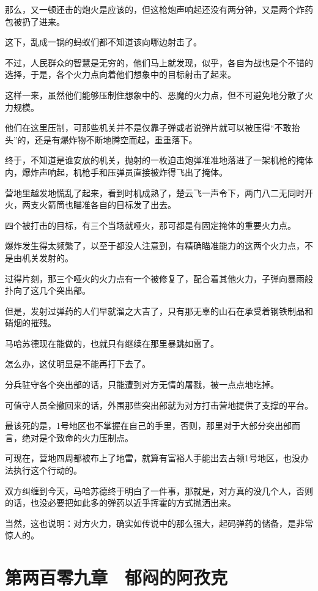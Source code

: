 那么，又一顿还击的炮火是应该的，但这枪炮声响起还没有两分钟，又是两个炸药包被扔了进来。

这下，乱成一锅的蚂蚁们都不知道该向哪边射击了。

不过，人民群众的智慧是无穷的，他们马上就发现，似乎，各自为战也是个不错的选择，于是，各个火力点向着他们想象中的目标射击了起来。

这样一来，虽然他们能够压制住想象中的、恶魔的火力点，但不可避免地分散了火力规模。

他们在这里压制，可那些机关并不是仅靠子弹或者说弹片就可以被压得“不敢抬头”的，还是有爆炸物不断地腾空而起，重重落下。

终于，不知道是谁安放的机关，抛射的一枚迫击炮弹准准地落进了一架机枪的掩体内，爆炸声响起，机枪手和压弹员直接被炸得飞出了掩体。

营地里越发地慌乱了起来，看到时机成熟了，楚云飞一声令下，两门八二无同时开火，两支火箭筒也瞄准各自的目标发了出去。

四个被打击的目标，有三个当场就哑火，那可都是有固定掩体的重要火力点。

爆炸发生得太频繁了，以至于都没人注意到，有精确瞄准能力的这两个火力点，不是由机关发射的。

过得片刻，那三个哑火的火力点有一个被修复了，配合着其他火力，子弹向暴雨般扑向了这几个突出部。

但是，发射过弹药的人们早就溜之大吉了，只有那无辜的山石在承受着钢铁制品和硝烟的摧残。

马哈苏德现在能做的，也就只有继续在那里暴跳如雷了。

怎么办，这仗明显是不能再打下去了。

分兵驻守各个突出部的话，只能遭到对方无情的屠戮，被一点点地吃掉。

可值守人员全撤回来的话，外围那些突出部就为对方打击营地提供了支撑的平台。

最该死的是，1号地区也不掌握在自己的手里，否则，那里对于大部分突出部而言，绝对是个致命的火力压制点。

可现在，营地四周都被布上了地雷，就算有富裕人手能出去占领1号地区，也没办法执行这个行动的。

双方纠缠到今天，马哈苏德终于明白了一件事，那就是，对方真的没几个人，否则的话，也没必要把如此多的弹药以近乎挥霍的方式抛洒出来。

当然，这也说明：对方火力，确实如传说中的那么强大，起码弹药的储备，是非常惊人的。

\section{第两百零九章　郁闷的阿孜克}

